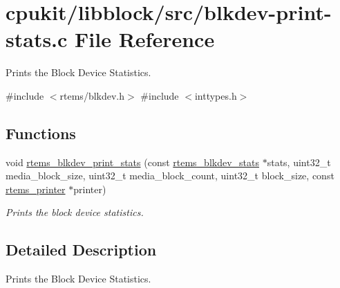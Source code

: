 \hypertarget{blkdev-print-stats_8c}{}\section{cpukit/libblock/src/blkdev-\/print-\/stats.c File Reference}
\label{blkdev-print-stats_8c}


Prints the Block Device Statistics.  


{\ttfamily \#include $<$rtems/blkdev.\+h$>$}\newline
{\ttfamily \#include $<$inttypes.\+h$>$}\newline
\subsection*{Functions}
\begin{DoxyCompactItemize}
\item 
void \mbox{\hyperlink{group__rtems__blkdev_gab318e4ab409ba1adb81fd6ad21314656}{rtems\+\_\+blkdev\+\_\+print\+\_\+stats}} (const \mbox{\hyperlink{structrtems__blkdev__stats}{rtems\+\_\+blkdev\+\_\+stats}} $\ast$stats, uint32\+\_\+t media\+\_\+block\+\_\+size, uint32\+\_\+t media\+\_\+block\+\_\+count, uint32\+\_\+t block\+\_\+size, const \mbox{\hyperlink{structrtems__printer}{rtems\+\_\+printer}} $\ast$printer)
\begin{DoxyCompactList}\small\item\em Prints the block device statistics. \end{DoxyCompactList}\end{DoxyCompactItemize}


\subsection{Detailed Description}
Prints the Block Device Statistics. 

